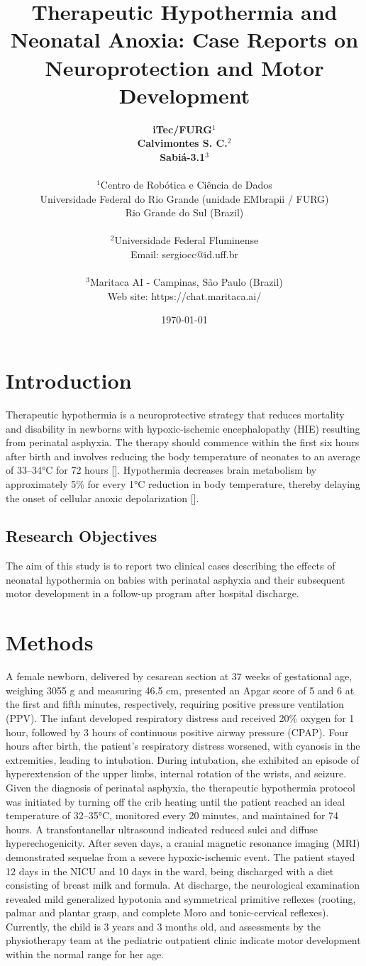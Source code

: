 \documentclass[11pt,a4paper]{article}
\title{\textbf{Therapeutic Hypothermia and Neonatal Anoxia: Case Reports on Neuroprotection and Motor Development}}
\author{
	\textbf{iTec/FURG}$^{1}$ \\
	\textbf{Calvimontes S. C.}$^{2}$ \\
	\textbf{Sabiá-3.1}$^{3}$ \\
	\\
	\small $^{1}$Centro de Robótica e Ciência de Dados \\
	\small Universidade Federal do Rio Grande (unidade EMbrapii / FURG) \\
	\small Rio Grande do Sul (Brazil) \\
	\\
	\small $^{2}$Universidade Federal Fluminense \\
	\small Email: sergiocc@id.uff.br \\
	\\
	\small $^{3}$Maritaca AI - Campinas, São Paulo (Brazil) \\
	\small Web site: https://chat.maritaca.ai/
}
\date{\today}
\begin{document}
	
	\maketitle
	
	\newpage
	
	\section{Introduction}
	Therapeutic hypothermia is a neuroprotective strategy that reduces mortality and disability in newborns with hypoxic-ischemic encephalopathy (HIE) resulting from perinatal asphyxia. The therapy should commence within the first six hours after birth and involves reducing the body temperature of neonates to an average of 33–34°C for 72 hours [\cite{Azzopardi2014, Laptook2017, Silveira2015}]. Hypothermia decreases brain metabolism by approximately 5\% for every 1°C reduction in body temperature, thereby delaying the onset of cellular anoxic depolarization [\cite{Silveira2015}].
		
	\subsection{Research Objectives}
	The aim of this study is to report two clinical cases describing the effects of neonatal hypothermia on babies with perinatal asphyxia and their subsequent motor development in a follow-up program after hospital discharge.
	
	\section{Methods}
	A female newborn, delivered by cesarean section at 37 weeks of gestational age, weighing 3055 g and measuring 46.5 cm, presented an Apgar score of 5 and 6 at the first and fifth minutes, respectively, requiring positive pressure ventilation (PPV). The infant developed respiratory distress and received 20\% oxygen for 1 hour, followed by 3 hours of continuous positive airway pressure (CPAP). Four hours after birth, the patient's respiratory distress worsened, with cyanosis in the extremities, leading to intubation. During intubation, she exhibited an episode of hyperextension of the upper limbs, internal rotation of the wrists, and seizure. Given the diagnosis of perinatal asphyxia, the therapeutic hypothermia protocol was initiated by turning off the crib heating until the patient reached an ideal temperature of 32–35°C, monitored every 20 minutes, and maintained for 74 hours. A transfontanellar ultrasound indicated reduced sulci and diffuse hyperechogenicity. After seven days, a cranial magnetic resonance imaging (MRI) demonstrated sequelae from a severe hypoxic-ischemic event. The patient stayed 12 days in the NICU and 10 days in the ward, being discharged with a diet consisting of breast milk and formula. At discharge, the neurological examination revealed mild generalized hypotonia and symmetrical primitive reflexes (rooting, palmar and plantar grasp, and complete Moro and tonic-cervical reflexes). Currently, the child is 3 years and 3 months old, and assessments by the physiotherapy team at the pediatric outpatient clinic indicate motor development within the normal range for her age.
	
\end{document}
